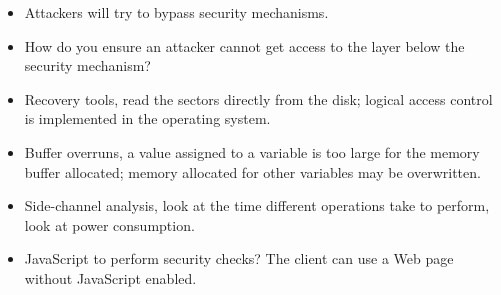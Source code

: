\begin{frame}
  \begin{itemize}
    \item Attackers will try to bypass security mechanisms.

    \item How do you ensure an attacker cannot get access to the layer below 
      the security mechanism?
  \end{itemize}
\end{frame}

\begin{frame}
  \begin{itemize}
    \item Recovery tools, read the sectors directly from the disk; logical 
      access control is implemented in the operating system.

    \item Buffer overruns, a value assigned to a variable is too large for the 
      memory buffer allocated; memory allocated for other variables may be 
      overwritten.

    \item Side-channel analysis, look at the time different operations take to 
      perform, look at power consumption.

    \item JavaScript to perform security checks?
      The client can use a Web page without JavaScript enabled.

  \end{itemize}
\end{frame}



\begin{frame}[allowframebreaks]
  \small
  \printbibliography{}
\end{frame}

